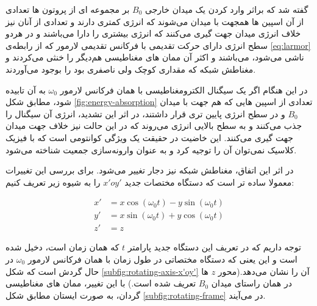 گفته شد که براثر وارد کردن یک میدان خارجی $B_0$ بر مجموعه ای از پروتون ها تعدادی از آن اسپین ها همجهت با میدان می‌شوند که انرژی کمتری دارند و تعدادی از آنان نیز خلاف انرژی میدان جهت گیری می‌کنند که انرژی بیشتری را دارا می‌باشند و در هردو سطح انرژی
دارای حرکت تقدیمی با فرکانس تقدیمی لارمور که از رابطه‌ی \ref{eq:larmor}
ناشی می‌شود، می‌باشند و اکثر آن ممان های مغناطیسی هم‌دیگر را خنثی می‌کردند و مغناطش شبکه که مقداری کوچک ولی ناصفری بود را بوجود می‌آوردند. 



در این هنگام اگر یک سیگنال الکترومغناطیسی 
با همان فرکانس لارمور $\omega_0$
به آن تابیده شود، مطابق شکل \ref{fig:energy-absorption}
تعدادی از اسپین هایی که هم جهت با میدان $B_0$ و در سطح انرژی پایین تری قرار داشتند، در اثر این تشدید، انرژی آن سیگنال را جذب می‌کنند و به سطح بالایی انرژی می‌روند که در این حالت نیز خلاف جهت میدان جهت گیری می‌کنند. این خاضیت در حقیقت یک ویژگی کوانتومی است که با فیزیک کلاسیک نمی‌توان آن را توجیه کرد و به عنوان وارونه‌سازی جمعیت
شناخته می‌شود.



در اثر این اتفاق، مغناطش شبکه نیز دجار تغییر می‌شود. برای بررسی این تغییرات معمولا ساده تر است که دستگاه مختصات جدید $x'oy'$ 
را به شیوه زیر تعریف کنیم:

\removevspace
\begin{subequations}
\begin{align}\label{eq:x'oy'}
	x' &= x \cos(\omega_0 t) - y \sin(\omega_0 t) \\ 
	y' &= x \sin(\omega_0 t) + y \cos(\omega_0 t) \\ 
	z' &= z 
\end{align}
\end{subequations}

توجه داریم که در تعریف این دستگاه جدید پارامتر $t$ که همان زمان است، دخیل شده است و این یعنی
که دستگاه  مختصاتی در طول زمان با همان فرکانس لارمور $\omega_0$ در حال گردش است که شکل \ref{subfig:rotating-axis-x'oy'} آن را نشان می‌دهد.(محور $z$ ها در همان راستای میدان $B_0$ تعریف شده است.) با این تغییر، ممان های مغناطیسی گردان، به صورت ایستان 
مطابق شکل \ref{subfig:rotating-frame}
در می‌آیند.





